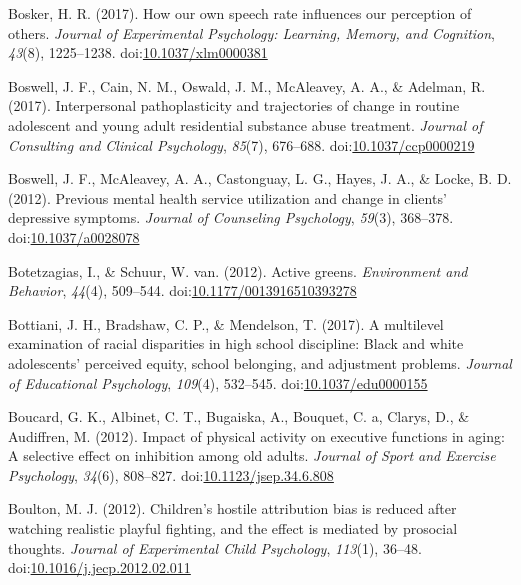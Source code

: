 \documentclass[english,man]{apa6}
\begin{document}
\hypertarget{ref-Bosker2017}{}
Bosker, H. R. (2017). How our own speech rate influences our perception
of others. \emph{Journal of Experimental Psychology: Learning, Memory,
and Cognition}, \emph{43}(8), 1225--1238.
doi:\href{https://doi.org/10.1037/xlm0000381}{10.1037/xlm0000381}

\hypertarget{ref-Boswell2017a}{}
Boswell, J. F., Cain, N. M., Oswald, J. M., McAleavey, A. A., \&
Adelman, R. (2017). Interpersonal pathoplasticity and trajectories of
change in routine adolescent and young adult residential substance abuse
treatment. \emph{Journal of Consulting and Clinical Psychology},
\emph{85}(7), 676--688.
doi:\href{https://doi.org/10.1037/ccp0000219}{10.1037/ccp0000219}

\hypertarget{ref-Boswell2012}{}
Boswell, J. F., McAleavey, A. A., Castonguay, L. G., Hayes, J. A., \&
Locke, B. D. (2012). Previous mental health service utilization and
change in clients' depressive symptoms. \emph{Journal of Counseling
Psychology}, \emph{59}(3), 368--378.
doi:\href{https://doi.org/10.1037/a0028078}{10.1037/a0028078}

\hypertarget{ref-Botetzagias2012}{}
Botetzagias, I., \& Schuur, W. van. (2012). Active greens.
\emph{Environment and Behavior}, \emph{44}(4), 509--544.
doi:\href{https://doi.org/10.1177/0013916510393278}{10.1177/0013916510393278}

\hypertarget{ref-Bottiani2017}{}
Bottiani, J. H., Bradshaw, C. P., \& Mendelson, T. (2017). A multilevel
examination of racial disparities in high school discipline: Black and
white adolescents' perceived equity, school belonging, and adjustment
problems. \emph{Journal of Educational Psychology}, \emph{109}(4),
532--545.
doi:\href{https://doi.org/10.1037/edu0000155}{10.1037/edu0000155}

\hypertarget{ref-Boucard2012}{}
Boucard, G. K., Albinet, C. T., Bugaiska, A., Bouquet, C. a, Clarys, D.,
\& Audiffren, M. (2012). Impact of physical activity on executive
functions in aging: A selective effect on inhibition among old adults.
\emph{Journal of Sport and Exercise Psychology}, \emph{34}(6), 808--827.
doi:\href{https://doi.org/10.1123/jsep.34.6.808}{10.1123/jsep.34.6.808}

\hypertarget{ref-Boulton2012}{}
Boulton, M. J. (2012). Children's hostile attribution bias is reduced
after watching realistic playful fighting, and the effect is mediated by
prosocial thoughts. \emph{Journal of Experimental Child Psychology},
\emph{113}(1), 36--48.
doi:\href{https://doi.org/10.1016/j.jecp.2012.02.011}{10.1016/j.jecp.2012.02.011}
\end{document}
